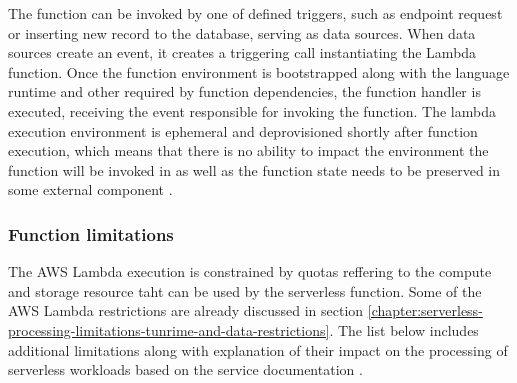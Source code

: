 The function can be invoked by one of defined triggers, such as endpoint request or inserting new record to the database, serving as data sources. 
When data sources create an event, it creates a triggering call instantiating the Lambda function. 
Once the function environment is bootstrapped along with the language runtime and other required by function dependencies, the function handler is executed, receiving the event responsible for invoking the function. 
The lambda execution environment is ephemeral and deprovisioned shortly after function execution, which means that there is no ability to impact the environment the function will be invoked in as well as the function state needs to be preserved in some external component \cite{BuildingMicroservicesWithAWSLambda}. 

\subsubsection*{Function limitations}

The AWS Lambda execution is constrained by quotas reffering to the compute and storage resource taht can be used by the serverless function. 
Some of the AWS Lambda restrictions are already discussed in section \ref{chapter:serverless-processing-limitations-tunrime-and-data-restrictions}. 
The list below includes additional limitations along with explanation of their impact on the processing of serverless workloads based on the service documentation \cite{AWSLambdaQuotas}.

